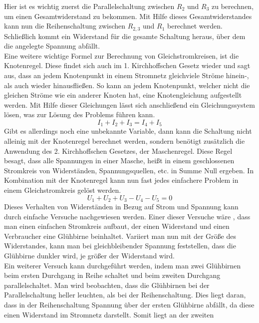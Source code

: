 Hier ist es wichtig zuerst die Parallelschaltung zwischen $R_2$ und $R_3$ zu berechnen, um einen Gesamtwiderstand zu bekommen. Mit Hilfe dieses 
Gesamtwiderstandes kann nun die Reihenschaltung zwischen $R_{2,3}$ und $R_1$ berechnet werden. Schließlich kommt ein Widerstand für die gesamte Schaltung
heraus, über dem die angelegte Spannung abfällt.\\
Eine weitere wichtige Formel zur Berechnung von Gleichstromkreisen, ist die Knotenregel. Diese findet sich auch im 1. Kirchhoffschen Gesetz wieder und sagt 
aus, dass an jedem Knotenpunkt in einem Stromnetz gleichviele Ströme hinein-, als auch wieder hinausfließen. So kann an jedem Knotenpunkt, welcher nicht 
die gleichen Ströme wie ein anderer Knoten hat, eine Knotengleichung aufgestellt werden. Mit Hilfe dieser Gleichungen lässt sich anschließend ein 
Gleichungssystem lösen, was zur Lösung des Problems führen kann.
\begin{equation}
I_1+I_2+I_3=I_4+I_5
\label{eqn:1. Kirchhoffsches Gesetz}
\end{equation}
Gibt es allerdings noch eine unbekannte Variable, dann kann die Schaltung nicht alleinig mit der Knotenregel berechnet werden, sondern benötigt zusätzlich die 
Anwendung des 2. Kirchhoffschen Gesetzes, der Maschenregel. Diese Regel besagt, dass alle Spannungen in einer Masche, heißt in einem geschlossenen Stromkreis 
von Widerständen, Spannungsquellen, etc. in Summe Null ergeben. In Kombination mit der Knotenregel kann nun fast jedes einfachere Problem in einem 
Gleichstromkreis gelöst werden.
\begin{equation}
U_1+U_2+U_3-U_4-U_5=0
\label{eqn:2. Kirchhoffsches Gesetz}
\end{equation}
Dieses Verhalten von Widerständen in Bezug auf Strom und Spannung kann durch einfache Versuche nachgewiesen werden. Einer dieser Versuche wäre \zB, dass 
man einen einfachen Stromkreis aufbaut, der einen Widerstand und einen Verbraucher \zB eine Glühbirne beinhaltet. Variiert man nun mit der Größe des 
Widerstandes, kann man bei gleichbleibender Spannung feststellen, dass die Glühbirne dunkler wird, je größer der Widerstand wird.\\ 
Ein weiterer Versuch kann durchgeführt werden, indem man zwei Glühbirnen beim ersten Durchgang in Reihe schaltet und beim zweiten Durchgang 
parallelschaltet. Man wird beobachten, dass die Glühbirnen bei der Parallelschaltung heller leuchten, als bei der Reihenschaltung. Dies liegt daran, 
dass in der Reihenschaltung Spannung über der ersten Glühbirne abfällt, da diese einen Widerstand im Stromnetz darstellt. Somit liegt an der zweiten 

